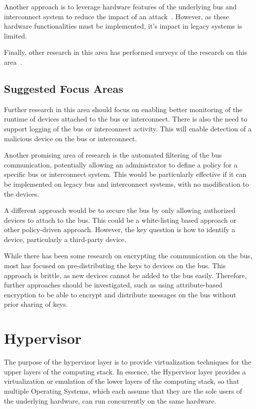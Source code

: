 \documentclass[11pt,letterpaper]{article}
\begin{document}
Another approach is to leverage hardware features of the underlying
bus and interconnect system to reduce the impact of an
attack~\cite{wolf2012, wojtczuk2011}. However, as these hardware
functionalities must be implemented, it's impact in legacy systems is
limited.

Finally, other research in this area has performed surveys of the
research on this area~\cite{kleberger2011, studnia2013, thom2008,
  wolf2004, wolf2007, wright2011, zhao2002}.

\subsection{Suggested Focus Areas}

Further research in this area should focus on enabling better
monitoring of the runtime of devices attached to the bus or
interconnect. There is also the need to support logging of the bus or
interconnect activity. This will enable detection of a malicious
device on the bus or interconnect.

Another promising area of research is the automated filtering of
the bus communication, potentially allowing an administrator to define
a policy for a specific bus or interconnect system. This would be
particularly effective if it can be implemented on legacy bus and
interconnect systems, with no modification to the devices.

A different approach would be to secure the bus by only allowing
authorized devices to attach to the bus. This could be a white-listing
based approach or other policy-driven approach. However, the key
question is how to identify a device, particularly a third-party
device.

While there has been some research on encrypting the communication on
the bus, most has focused on pre-distributing the keys to devices on
the bus. This approach is brittle, as new devices cannot be added to
the bus easily. Therefore, further approaches should be investigated,
such as using attribute-based encryption to be able to encrypt and
distribute messages on the bus without prior sharing of keys.

\section{Hypervisor}

The purpose of the hypervisor layer is to provide virtualization
techniques for the upper layers of the computing stack. In essence,
the Hypervisor layer provides a virtualization or emulation of the
lower layers of the computing stack, so that multiple Operating
Systems, which each assume that they are the sole users of the
underlying hardware, can run concurrently on the same hardware.
\end{document}
